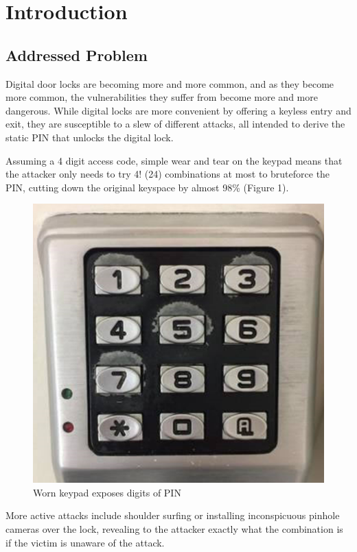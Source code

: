 \documentclass[conference]{IEEEtran}
\begin{document}
\section{Introduction}

\subsection{Addressed Problem}

Digital door locks are becoming more and more common, and as they become more common, the vulnerabilities they suffer from become more and more dangerous. While digital locks are more convenient by offering a keyless entry and exit, they are susceptible to a slew of different attacks, all intended to derive the static PIN that unlocks the digital lock.

Assuming a 4 digit access code, simple wear and tear on the keypad means that the attacker only needs to try 4! (24) combinations at most to bruteforce the PIN, cutting down the original keyspace by almost 98\% (Figure 1).

\begin{figure}[h!]
  \includegraphics[width=\linewidth]{worn_lock.png}
  \caption{Worn keypad exposes digits of PIN}
  \label{fig:wornlock}
\end{figure}

More active attacks include shoulder surfing or installing inconspicuous pinhole cameras over the lock, revealing to the attacker exactly what the combination is if the victim is unaware of the attack. 
\end{document}
